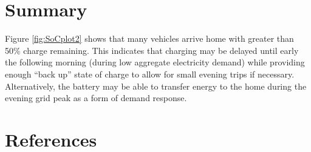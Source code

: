\documentclass[]{article}
\begin{document}
\section{Summary}\label{summary}

Figure \ref{fig:SoCplot2} shows that many vehicles arrive home with
greater than 50\% charge remaining. This indicates that charging may be
delayed until early the following morning (during low aggregate
electricity demand) while providing enough ``back up'' state of charge
to allow for small evening trips if necessary. Alternatively, the
battery may be able to transfer energy to the home during the evening
grid peak as a form of demand response.

\section{References}\label{references}
\end{document}

